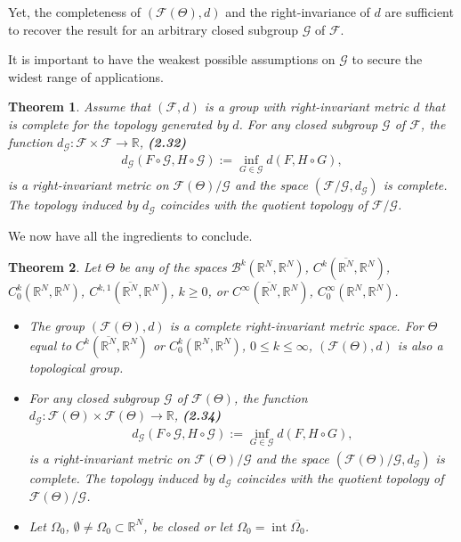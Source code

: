 \documentclass{book}
\numberwithin{equation}{section}
\newtheorem{theorem}{Theorem}[section]
\begin{document}
\begin{enumerate}
    Yet, the completeness of $(\mathcal{F}(\Theta),d)$ and the right-invariance of $d$ are sufficient to recover the result for an arbitrary closed subgroup $\mathcal{G}$ of $\mathcal{F}$.
    
    It is important to have the weakest possible assumptions on $\mathcal{G}$ to secure the widest range of applications.
    
    \begin{theorem}
        Assume that $(\mathcal{F},d)$ is a group with right-invariant metric $d$ that is complete for the topology generated by $d$. For any closed subgroup $\mathcal{G}$ of $\mathcal{F}$, the function $d_{\mathcal{G}}:\mathcal{F}\times\mathcal{F}\to\mathbb{R}$, \textbf{(2.32)}
        \begin{align*}
            d_{\mathcal{G}}\left(F\circ\mathcal{G},H\circ\mathcal{G}\right) := \inf_{G\in\mathcal{G}} d\left(F,H\circ G\right),
        \end{align*}
        is a right-invariant metric on $\mathcal{F}(\Theta)/\mathcal{G}$ and the space $(\mathcal{F}/\mathcal{G},d_{\mathcal{G}})$ is complete. The topology induced by $d_{\mathcal{G}}$ coincides with the quotient topology of $\mathcal{F}/\mathcal{G}$.
    \end{theorem}
    We now have all the ingredients to conclude.
    
    \begin{theorem}
        Let $\Theta$ be any of the spaces $\mathcal{B}^k(\mathbb{R}^N,\mathbb{R}^N)$, $C^k(\overline{\mathbb{R}^N},\mathbb{R}^N)$, $C_0^k(\mathbb{R}^N,\mathbb{R}^N)$, $C^{k,1}(\overline{\mathbb{R}^N},\mathbb{R}^N)$, $k\ge 0$, or $C^\infty(\overline{\mathbb{R}^N},\mathbb{R}^N)$, $C_0^\infty(\mathbb{R}^N,\mathbb{R}^N)$.
        \begin{itemize}
            \item[(i)] The group $(\mathcal{F}(\Theta),d)$ is a complete right-invariant metric space. For $\Theta$ equal to $C^k(\overline{\mathbb{R}^N},\mathbb{R}^N)$ or $C_0^k(\mathbb{R}^N,\mathbb{R}^N)$, $0\le k\le\infty$, $(\mathcal{F}(\Theta),d)$ is also a topological group.
            \item[(ii)] For any closed subgroup $\mathcal{G}$ of $\mathcal{F}(\Theta)$, the function $d_{\mathcal{G}}:\mathcal{F}(\Theta)\times\mathcal{F}(\Theta)\to\mathbb{R}$, \textbf{(2.34)}
            \begin{align*}
                d_{\mathcal{G}}\left(F\circ\mathcal{G},H\circ\mathcal{G}\right) := \inf_{G\in\mathcal{G}} d\left(F,H\circ G\right),
            \end{align*}
            is a right-invariant metric on $\mathcal{F}(\Theta)/\mathcal{G}$ and the space $(\mathcal{F}(\Theta)/\mathcal{G},d_{\mathcal{G}})$ is complete. The topology induced by $d_{\mathcal{G}}$ coincides with the quotient topology of $\mathcal{F}(\Theta)/\mathcal{G}$.
            \item[(iii)] Let $\Omega_0$, $\emptyset\ne\Omega_0\subset\mathbb{R}^N$, be closed or let $\Omega_0 = \operatorname{int}\overline{\Omega_0}$. 
            

\end{itemize}
\end{theorem}
\end{enumerate}
\end{document}
